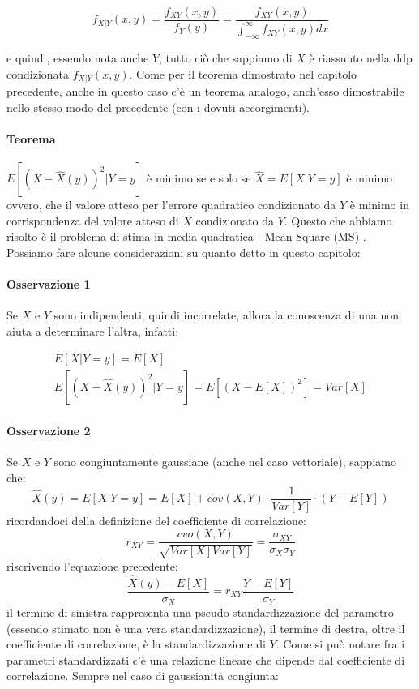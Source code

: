   \[ f_{X|Y}(x,y) = \frac{f_{XY}(x,y)}{f_Y(y)}= \frac{f_{XY}(x,y)}{\int_{-\infty}^{\infty} f_{XY}(x,y)dx} \]
  
e quindi, essendo nota anche $Y$, tutto ciò che sappiamo di $X$ è riassunto nella ddp condizionata $f_{X|Y}(x,y)$. Come per il teorema dimostrato nel capitolo precedente, anche in questo caso c'è un teorema analogo, anch'esso dimostrabile nello stesso modo del precedente (con i dovuti accorgimenti).

\paragraph{Teorema} $E\left[(X-\hat{X}(y))^2|Y=y\right]$ è minimo se e solo se $\hat{X}=E[X|Y=y]$
 è minimo 
ovvero, che il valore atteso per l'errore quadratico condizionato da $Y$ è minimo in corrispondenza del valore atteso di $X$ condizionato da $Y$.\newline
Questo che abbiamo risolto è il problema di stima in media quadratica - Mean Square (MS) . Possiamo fare alcune considerazioni su quanto detto in questo capitolo:
\paragraph{Osservazione 1} Se $X$ e $Y$ sono indipendenti, quindi incorrelate, allora la conoscenza di una non aiuta a determinare l'altra, infatti:

  \begin{gather*}
    E[X|Y=y]=E[X] \\
    E\left[(X-\hat{X}(y))^2|Y=y\right]=E\left[(X-E[X])^2\right]=Var[X]
  \end{gather*}
  
\paragraph{Osservazione 2} Se $X$ e $Y$ sono congiuntamente gaussiane (anche nel caso vettoriale), sappiamo che:
  \[ \hat{X}(y)=E[X|Y=y]=E[X]+cov(X,Y) \cdot \frac{1}{Var[Y]} \cdot (Y-E[Y]) \]
ricordandoci della definizione del coefficiente di correlazione:
  \[ r_{XY}=\frac{cvo(X,Y)}{\sqrt{Var[X]Var[Y]} }=\frac{\sigma_{XY}}{\sigma_X\sigma_Y} \]
riscrivendo l'equazione precedente:
  \[ \frac{\hat{X}(y)-E[X]}{\sigma_X}=r_{XY}\frac{Y-E[Y]}{\sigma_Y} \]
il termine di sinistra rappresenta una pseudo standardizzazione del parametro (essendo stimato non è una vera standardizzazione), il termine di destra, oltre il coefficiente di correlazione, è la standardizzazione di $Y$. Come si può notare fra i parametri standardizzati c'è una relazione lineare che dipende dal coefficiente di correlazione.\newline
Sempre nel caso di gaussianità congiunta:

